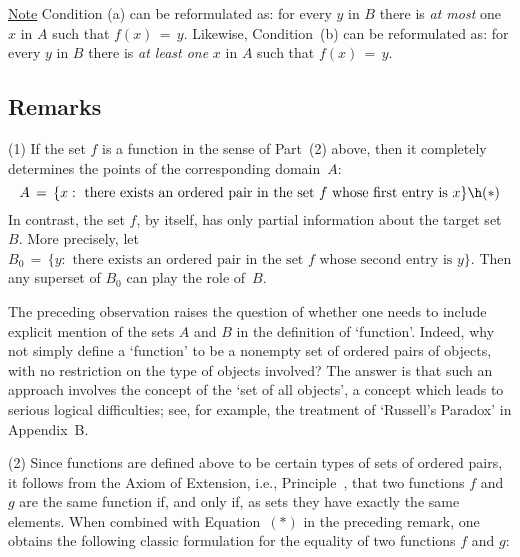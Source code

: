         \underline{Note} Condition (a) can be reformulated as: for every $y$ in $B$ there is {\em at most} one $x$ in $A$ such that $f(x) \,=\, y$.
    Likewise, Condition~(b) can be reformulated as: for every $y$ in $B$ there is {\em at least one} $x$ in $A$ such that $f(x) \,=\, y$.

\VV


        \subsection{\small{\bf Remarks}}
        \label{RemrkA30.12}

\hspace*{\parindent} (1) If the set $f$ is a function in the sense of Part~(2) above, then it completely determines the points of the corresponding domain~$A$:
        \begin{displaymath}
        A \,=\, \{x: \mbox{ there exists an ordered pair in the set $f$ whose first entry is $x$}\} \h ({\ast})
        \end{displaymath}
    In contrast, the set $f$, by itself, has only partial information about the target set~$B$.
    More precisely, let $B_{0} \,=\, \{y: \mbox{ there exists an ordered pair in the set $f$ whose second entry is $y$}\}$.
    Then any superset of $B_{0}$ can play the role of~$B$.

        The preceding observation raises the question of whether one needs to include explicit mention of the sets $A$ and $B$ in the definition of `function'.
    Indeed, why not simply define a `function' to be a nonempty set of ordered pairs of objects, with no restriction on the type of objects involved?
    The answer is that such an approach involves the concept of the `set of all objects',
    a concept which leads to serious logical difficulties; see, for example, the treatment of `Russell's Paradox' in Appendix~B.

\V

        (2) Since functions are defined above to be certain types of sets of ordered pairs,
    it follows from the Axiom of Extension, i.e., Principle~, that two functions $f$ and $g$ are the same function if, and only if,
    as sets they have exactly the same elements. When combined with Equation~$({\ast})$ in the preceding remark,
    one obtains the following classic formulation for the equality of two functions $f$ and $g$:

\VA

